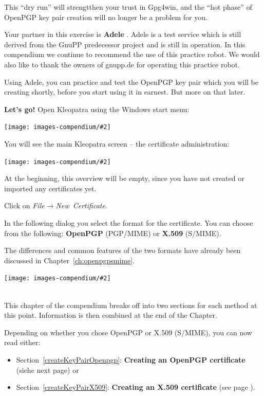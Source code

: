 \documentclass[a4paper,11pt,oneside,openright,titlepage]{scrbook}
\newcommand{\Menu}[1]{\textit{#1}}
\newcommand{\IncludeImage}[2][]{
\begin{center}
  \texttt{[image: images-compendium/\#2]}%
\end{center}
}
\begin{document}
This ``dry run'' will strengtthen your trust in Gpg4win, and the ``hot
phase'' of OpenPGP key pair creation will no longer be a problem for
you.

Your partner in this exercise is \textbf{Adele} . Adele is a test
service which is still derived from the GnuPP predecessor
project and is still in operation. In this compendium we
continue to recommend the use of this practice robot. We would also
like to thank the owners of gnupp.de for operating this practice
robot.

Using Adele, you can practice and test the OpenPGP key pair
which you will be creating shortly, before you start using it in earnest.
But more on that later.

\clearpage
\textbf{Let's go!}
Open Kleopatra using the Windows start menu:


\IncludeImage[width=0.7\textwidth]{sc-kleopatra-startmenu_en}

You will see the main Kleopatra screen --
the certificate administration:


\IncludeImage[width=0.85\textwidth]{sc-kleopatra-mainwindow-empty_en}

At the beginning, this overview will be empty, since you have not
created or imported any certificates yet.

\clearpage
Click on \Menu{File$\rightarrow$New~Certificate}.

In the following dialog you select the format for the certificate. You
can choose from the following: \textbf{OpenPGP} (PGP/MIME)
or \textbf{X.509} (S/MIME).

The differences and common features of the two formats have already been
discussed in Chapter~\ref{ch:openpgpsmime}.

\label{chooseCertificateFormat}
\IncludeImage[width=0.85\textwidth]{sc-kleopatra-ChooseCertificateFormat_en}

~\\ This chapter of the compendium breaks off into two
sections for each method at this point. Information is then combined
at the end of the Chapter.

Depending on whether you chose OpenPGP or X.509 (S/MIME), you can now
read either:
\begin{itemize}
    \item Section~\ref{createKeyPairOpenpgp}:
        \textbf{Creating an OpenPGP certificate} \T(siehe next
        page) or
    \item Section~\ref{createKeyPairX509}:
        \textbf{Creating an X.509 certificate} \T (see page
        \pageref{createKeyPairX509}).
\end{itemize}
\end{document}
